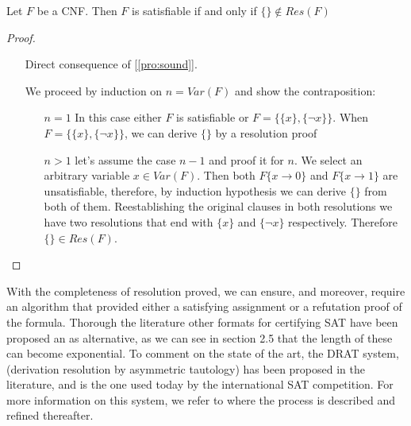 
\begin{theorem}
Let $F$ be a CNF. Then $F$ is satisfiable if and only if $\{\} \not\in Res(F)$
\end{theorem}
\begin{proof}\hfill
  \begin{itemize}\item[\fbox{$\Rightarrow$}] Direct consequence of [\ref{pro:sound}].
  \item[\fbox{$\Leftarrow$}] We proceed by induction on $n = Var(F)$ and show the contraposition:
    \begin{itemize}
    \item[$n=1$] In this case either $F$ is satisfiable or $F = \{\{x\},\{\neg x\}\}$.  When $F = \{\{x\},\{\neg x\}\}$, we can derive $\{\}$ by a resolution proof
      
    \item[$n>1$] let's assume the case $n-1$ and proof it for $n$. We select an arbitrary variable $x\in Var(F)$. Then both $F\{x\to 0\}$ and  $F\{x\to 1\}$ are unsatisfiable, therefore, by induction hypothesis we can derive $\{\}$ from both of them. Reestablishing the original clauses in both resolutions we have two resolutions that end with $\{x\}$ and $\{\neg x\}$ respectively. Therefore $\{\} \in Res(F)$.
    \end{itemize}
  \end{itemize}
\end{proof}

With the completeness of resolution proved, we can ensure, and moreover, require an algorithm that provided either a satisfying assignment or a refutation proof of the formula. Thorough the literature other formats for certifying SAT have been proposed an as alternative, as we can see in section 2.5 \cite{schoning2013satisfiability} that the length of these can become exponential.  To comment on the state of the art, the DRAT system, (derivation resolution by asymmetric tautology) has been proposed in the literature, and is the one used today by the international SAT competition. For more information on this system, we refer to \cite{lammich2020efficient} where the process is described and refined thereafter. 



